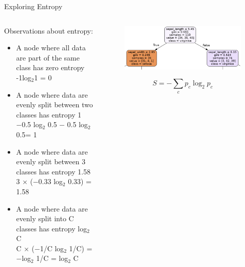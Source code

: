 \documentclass[aspectratio=169]{../latex_main/tntbeamer}  %
\begin{document}
	
	\begin{frame}{Exploring Entropy}
	    \begin{columns}
	        \begin{column}{.7\textwidth}
	                Observations about entropy:
	                \begin{itemize}
	                    \item A node where all data are part of the same class has zero entropy \\ -1log$_2$1 = 0
	                    \item A node where data are evenly split between two classes has entropy 1 \\−0.5 log$_2$⁡ 0.5 − 0.5 log$_2$⁡ 0.5= 1
	                    \item A node where data are evenly split between 3 classes has entropy 1.58 \\3 × (−0.33 log$_2$⁡ 0.33) = 1.58
	                    \item A node where data are evenly split into C classes has entropy log$_2$C \\ C × (−1/C log$_2$⁡ 1/C) = −log$_2$⁡ 1/C = log$_2$⁡ C
	                \end{itemize}
	        \end{column}
	        
	        \begin{column}{.3\textwidth}
	                \begin{figure}
	                    \centering
	                    \includegraphics[scale=.35]{Bild47}
	                \end{figure}
	                \begin{equation*}
                          S = -\sum\limits_c p_c\log_2p_c
                    \end{equation*}
	                
	        \end{column}
	    \end{columns}
	\end{frame}
	
\end{document}
